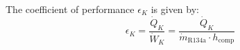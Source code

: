 The coefficient of performance \( \epsilon_K \) is given by:  
\[
\epsilon_K = \frac{\dot{Q}_K}{\dot{W}_K} = \frac{\dot{Q}_K}{\dot{m}_{\text{R134a}} \cdot h_{\text{comp}}}
\]